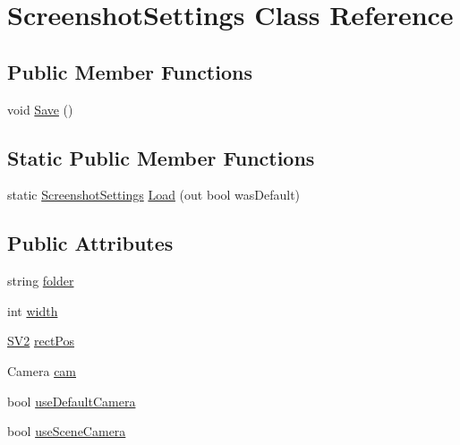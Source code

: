 \hypertarget{class_screenshot_settings}{}\section{Screenshot\+Settings Class Reference}
\label{class_screenshot_settings}
\subsection*{Public Member Functions}
\begin{DoxyCompactItemize}
\item 
void \mbox{\hyperlink{class_screenshot_settings_a2491e22a763d7c1ddea9af68b596f8c8}{Save}} ()
\end{DoxyCompactItemize}
\subsection*{Static Public Member Functions}
\begin{DoxyCompactItemize}
\item 
static \mbox{\hyperlink{class_screenshot_settings}{Screenshot\+Settings}} \mbox{\hyperlink{class_screenshot_settings_abcc070c37ede994593e90026b80b67af}{Load}} (out bool was\+Default)
\end{DoxyCompactItemize}
\subsection*{Public Attributes}
\begin{DoxyCompactItemize}
\item 
string \mbox{\hyperlink{class_screenshot_settings_a26677f189235e2945af9dc80fd0d6113}{folder}}
\item 
int \mbox{\hyperlink{class_screenshot_settings_af9b0c8022fb86b1903b697947c26180e}{width}}
\item 
\mbox{\hyperlink{class_s_v2}{S\+V2}} \mbox{\hyperlink{class_screenshot_settings_acbcc163c0246cdccfbb605a0ff217a86}{rect\+Pos}}
\item 
Camera \mbox{\hyperlink{class_screenshot_settings_a6e8589289fbe31245230484a6bf5f920}{cam}}
\item 
bool \mbox{\hyperlink{class_screenshot_settings_aa891d97771a5225cb6fc7a4070a0a235}{use\+Default\+Camera}}
\item 
bool \mbox{\hyperlink{class_screenshot_settings_a16dd12e8ed63fba96ceb605ae3a8d4d7}{use\+Scene\+Camera}}
\end{DoxyCompactItemize}


